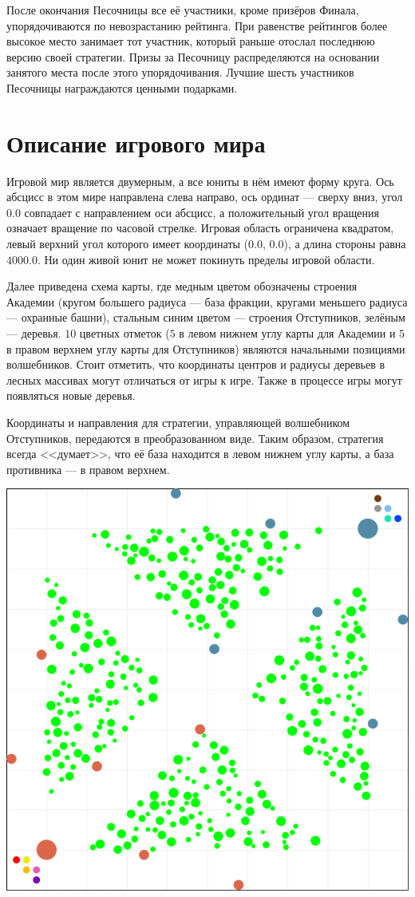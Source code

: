 После окончания Песочницы все её участники, кроме призёров Финала, упорядочиваются по невозрастанию рейтинга. При равенстве рейтингов более
высокое место занимает тот участник, который раньше отослал последнюю версию своей стратегии. Призы за Песочницу распределяются на основании
занятого места после этого упорядочивания. Лучшие шесть участников Песочницы награждаются ценными подарками.

\section{Описание игрового мира}

Игровой мир является двумерным, а все юниты в нём имеют форму круга. Ось абсцисс в этом мире направлена слева направо, ось ординат ---
сверху вниз, угол $0.0$ совпадает с направлением оси абсцисс, а положительный угол вращения означает вращение по часовой стрелке. Игровая
область ограничена квадратом, левый верхний угол которого имеет координаты ($0.0$, $0.0$), а длина стороны равна $4000.0$. Ни один живой
юнит не может покинуть пределы игровой области.

\newpage
Далее приведена схема карты, где медным цветом обозначены строения Академии (кругом большего радиуса --- база фракции, кругами меньшего
радиуса --- охранные башни), стальным синим цветом --- строения Отступников, зелёным --- деревья. $10$ цветных отметок ($5$ в левом нижнем
углу карты для Академии и $5$ в правом верхнем углу карты для Отступников) являются начальными позициями волшебников. Стоит отметить, что
координаты центров и радиусы деревьев в лесных массивах могут отличаться от игры к игре. Также в процессе игры могут появляться новые
деревья.

Координаты и направления для стратегии, управляющей волшебником Отступников, передаются в преобразованном виде. Таким образом, стратегия
всегда <<думает>>, что её база находится в левом нижнем углу карты, а база противника --- в правом верхнем.

\includegraphics{images/map.png}

